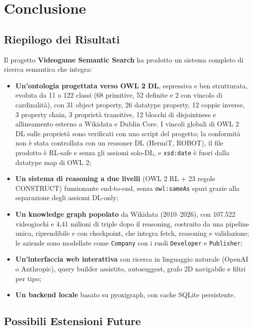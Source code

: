 \section{Conclusione}
\label{sec:conclusione}

\subsection{Riepilogo dei Risultati}

Il progetto \textbf{Videogame Semantic Search} ha prodotto un sistema completo
di ricerca semantica che integra:

\begin{itemize}[nosep]
  \item \textbf{Un'ontologia progettata verso OWL 2 DL}, espressiva e ben strutturata, evoluta da 11 a
    122 classi (68 primitive, 52 definite e 2 con vincolo di cardinalit\`a), con
    31 object property, 26 datatype property, 12 coppie inverse, 3 property chain,
    3 propriet\`a transitive, 12 blocchi di disjointness e allineamento esterno a
    Wikidata e Dublin Core. I vincoli globali di OWL 2 DL sulle propriet\`a sono verificati con uno script
    del progetto; la conformit\`a non \`e stata controllata con un reasoner DL (HermiT, ROBOT), il file
    prodotto \`e RL-safe e senza gli assiomi solo-DL, e \texttt{xsd:date} \`e fuori dalla datatype map di OWL 2;
  \item \textbf{Un sistema di reasoning a due livelli} (OWL 2 RL + 23 regole
    CONSTRUCT) funzionante end-to-end, senza \texttt{owl:sameAs} spuri grazie
    alla separazione degli assiomi DL-only;
  \item \textbf{Un knowledge graph popolato} da Wikidata (2010--2026), con 107.522 videogiochi e
    4,41 milioni di triple dopo il reasoning, costruito da una pipeline unica, riprendibile e con
    checkpoint, che integra fetch, reasoning e validazione; le aziende sono modellate come
    \texttt{Company} con i ruoli \texttt{Developer} e \texttt{Publisher};
  \item \textbf{Un'interfaccia web interattiva} con ricerca in linguaggio naturale (OpenAI o
    Anthropic), query builder assistito, autosuggest, grafo 2D navigabile e filtri per tipo;
  \item \textbf{Un backend locale} basato su pyoxigraph, con cache SQLite persistente.
\end{itemize}

\subsection{Possibili Estensioni Future}

